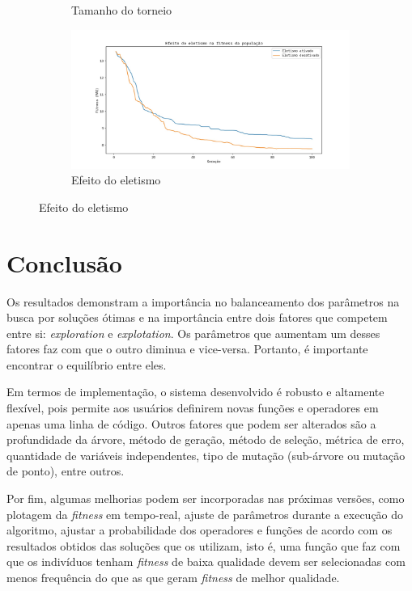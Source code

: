 \documentclass[a4paper]{article}
\begin{document}
\begin{figure}[h]
\begin{subfigure}[t]{0.5\textwidth}
      \caption{Tamanho do torneio}
      \label{fig:concrete_k_e}
    \end{subfigure}
    \begin{subfigure}[t]{0.5\textwidth}
      \includegraphics[width=\textwidth]{concrete_e}
      \caption{Efeito do eletismo}
      \label{fig:concrete_e}
    \end{subfigure}
\end{figure}

\section{Conclusão}
Os resultados demonstram a importância no balanceamento dos parâmetros na busca
por soluções ótimas e na importância entre dois fatores que competem entre si:
\textit{exploration} e \textit{explotation}. Os parâmetros que aumentam um
desses fatores faz com que o outro diminua e vice-versa. Portanto, é importante
encontrar o equilíbrio entre eles.

Em termos de implementação, o sistema desenvolvido é robusto e altamente
flexível, pois permite aos usuários definirem novas funções e operadores em
apenas uma linha de código. Outros fatores que podem ser alterados são a
profundidade da árvore, método de geração, método de seleção, métrica de erro,
quantidade de variáveis independentes, tipo de mutação (sub-árvore ou mutação de
ponto), entre outros.

Por fim, algumas melhorias podem ser incorporadas nas próximas versões, como
plotagem da \textit{fitness} em tempo-real, ajuste de parâmetros durante a
execução do algoritmo, ajustar a probabilidade dos operadores e funções de
acordo com os resultados obtidos das soluções que os utilizam, isto é, uma
função que faz com que os indivíduos tenham \textit{fitness} de baixa qualidade
devem ser selecionadas com menos frequência do que as que geram \textit{fitness}
de melhor qualidade.




\end{document}
